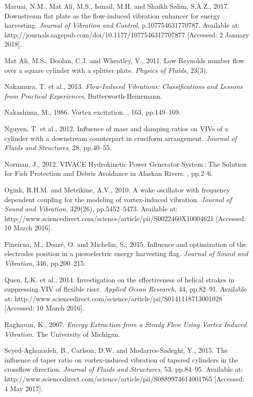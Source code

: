 \documentclass[]{article}
\begin{document}
Maruai, N.M., Mat Ali, M.S., Ismail, M.H. and Shaikh Salim, S.A.Z.,
2017. Downstream flat plate as the flow-induced vibration enhancer for
energy harvesting. \emph{Journal of Vibration and Control},
p.107754631770787. Available at:
http://journals.sagepub.com/doi/10.1177/1077546317707877 {[}Accessed: 2
January 2018{]}.

Mat Ali, M.S., Doolan, C.J. and Wheatley, V., 2011. Low Reynolds number
flow over a square cylinder with a splitter plate. \emph{Physics of
Fluids}, 23(3).

Nakamura, T. et al., 2013. \emph{Flow-Induced Vibrations:
Classifications and Lessons from Practical Experiences},
Butterworth-Heinemann.

Nakashima, M., 1986. Vortex excitation. , 163, pp.149--169.

Nguyen, T. et al., 2012. Influence of mass and damping ratios on VIVs of
a cylinder with a downstream counterpart in cruciform arrangement.
\emph{Journal of Fluids and Structures}, 28, pp.40--55.

Norman, J., 2012. VIVACE Hydrokinetic Power Generator System : The
Solution for Fish Protection and Debris Avoidance in Alaskan Rivers. ,
pp.2--6.

Ogink, R.H.M. and Metrikine, A.V., 2010. A wake oscillator with
frequency dependent coupling for the modeling of vortex-induced
vibration. \emph{Journal of Sound and Vibration}, 329(26),
pp.5452--5473. Available at:
http://www.sciencedirect.com/science/article/pii/S0022460X10004621
{[}Accessed: 10 March 2016{]}.

Pineirua, M., Doaré, O. and Michelin, S., 2015. Influence and
optimization of the electrodes position in a piezoelectric energy
harvesting flag. \emph{Journal of Sound and Vibration}, 346,
pp.200--215.

Quen, L.K. et al., 2014. Investigation on the effectiveness of helical
strakes in suppressing VIV of flexible riser. \emph{Applied Ocean
Research}, 44, pp.82--91. Available at:
http://www.sciencedirect.com/science/article/pii/S0141118713001028
{[}Accessed: 10 March 2016{]}.

Raghavan, K., 2007. \emph{Energy Extraction from a Steady Flow Using
Vortex Induced Vibration.} The University of Michigan.

Seyed-Aghazadeh, B., Carlson, D.W. and Modarres-Sadeghi, Y., 2015. The
influence of taper ratio on vortex-induced vibration of tapered
cylinders in the crossflow direction. \emph{Journal of Fluids and
Structures}, 53, pp.84--95. Available at:
http://www.sciencedirect.com/science/article/pii/S0889974614001765
{[}Accessed: 4 May 2017{]}.
\end{document}
